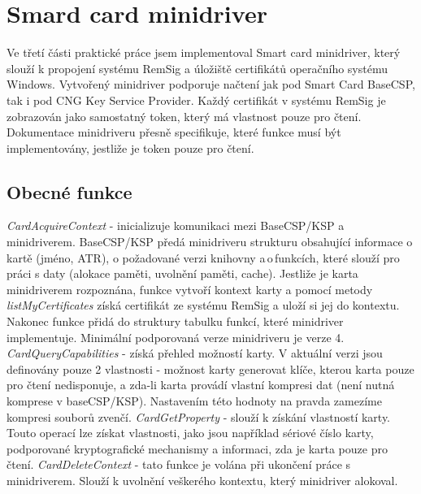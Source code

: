 \documentclass[]{fithesis3}
\begin{document}
	\section{Smard card minidriver}
	Ve třetí části praktické práce jsem implementoval Smart card minidriver, který slouží k propojení 	systému RemSig a úložiště certifikátů operačního systému Windows. Vytvořený minidriver 			podporuje načtení jak pod Smart Card BaseCSP, tak i pod CNG Key Service Provider. Každý 		certifikát v systému RemSig je zobrazován jako samostatný token, který má vlastnost pouze 		pro čtení. Dokumentace minidriveru přesně specifikuje, které funkce musí být implementovány, 		jestliže je token pouze pro čtení.

		\subsection{Obecné funkce}
		\textit{CardAcquireContext} - inicializuje komunikaci mezi BaseCSP/KSP a minidriverem. 			BaseCSP/KSP předá minidriveru strukturu obsahující informace o kartě (jméno, ATR), o 				požadované verzi knihovny a\,o\,funkcích, které slouží pro práci s daty (alokace paměti, 			uvolnění paměti, cache). Jestliže je karta minidriverem rozpoznána, funkce vytvoří 				kontext karty a pomocí metody \textit{listMyCertificates} získá certifikát ze systému 				RemSig a uloží si jej do kontextu. Nakonec funkce přidá do struktury tabulku funkcí, 			které minidriver implementuje. Minimální podporovaná verze minidriveru je verze 4.
		\newline
 		\newline
		\textit{CardQueryCapabilities} - získá přehled možností karty. V aktuální verzi jsou 				definovány pouze 2 vlastnosti - možnost karty generovat klíče, kterou karta pouze pro 			čtení nedisponuje, a zda-li karta provádí vlastní kompresi dat (není nutná komprese v 				baseCSP/KSP). Nastavením této hodnoty na pravda zamezíme kompresi souborů zvenčí.
		\newline
 		\newline
		\textit{CardGetProperty} - slouží k získání vlastností karty. Touto operací lze získat 				vlastnosti, jako jsou například sériové číslo karty, podporované kryptografické mechanismy 			a informaci, zda je karta pouze pro čtení.
		\newline
 		\newline
		\textit{CardDeleteContext} - tato funkce je volána při ukončení práce s minidriverem. 				Slouží k uvolnění veškerého kontextu, který minidriver alokoval.
\end{document}
